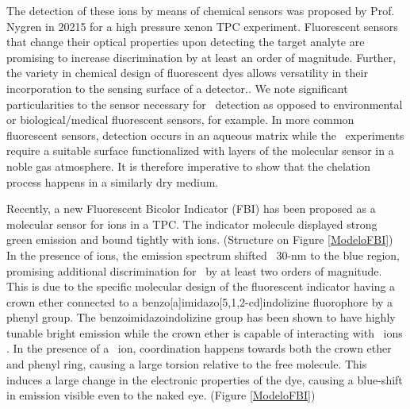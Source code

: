 \documentclass[aps,prl,reprint,longbibliography,superscriptaddress, english]{revtex4-1}
\begin{document}
The detection of these ions by means of chemical sensors was proposed by Prof. Nygren in 20215 for a high pressure xenon TPC experiment\cite{Nygren_2015}. 
Fluorescent sensors that change their optical properties upon detecting the target analyte are promising to increase discrimination by at least an order of magnitude.\cite{valeur_chemical} Further, the variety in chemical design of fluorescent dyes allows versatility in their incorporation to the sensing surface of a detector.\cite{valeur_chemical,wolfbeis_materials_2005,Jones:2016qiq, McDonald:2017izm, thapa_barium_2019, thapa_demonstration_2021}.
We note significant particularities to the sensor necessary for \bbonu\ detection as opposed to environmental or biological/medical fluorescent sensors, for example. In more common fluorescent sensors, detection occurs in an aqueous matrix while the \bbonu\ experiments require a suitable surface functionalized with layers of the molecular sensor in a noble gas atmosphere. It is therefore imperative to show that the chelation process happens in a similarly dry medium.


Recently, a new Fluorescent Bicolor Indicator (FBI) has been proposed as a molecular sensor for \Bapp ions in a TPC.\cite{rivilla_fluorescent_2020} The indicator molecule displayed strong green emission and bound tightly with \Bapp ions. (Structure on Figure \ref{ModeloFBI}) In the presence of \Bapp ions, the emission spectrum shifted ~30-nm to the blue region, promising additional discrimination for \bbonu\ by at least two orders of magnitude. This is due to the specific molecular design of the fluorescent indicator having a crown ether connected to a benzo[a]imidazo[5,1,2-cd]indolizine fluorophore by a phenyl group. The benzoimidazoindolizine group has been shown to have highly tunable bright emission\cite{Stasyuk_benzo,Levesque_general} while the crown ether is capable of interacting with \Bapp\ ions \cite{valeur_chemical,maleknia_cavity-size-dependent_2002}. In the presence of a \Bapp\ ion, coordination happens towards both the crown ether and phenyl ring, causing a large torsion relative to the free molecule. This induces a large change in the electronic properties of the dye, causing a blue-shift in emission visible even to the naked eye. (Figure \ref{ModeloFBI})




\end{document}
